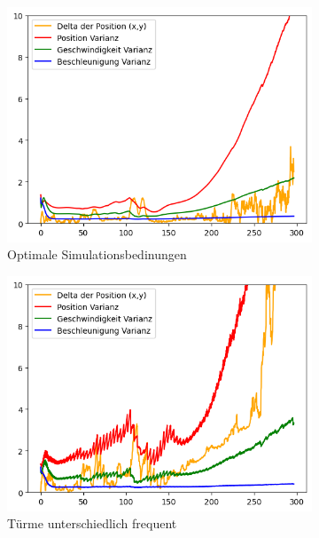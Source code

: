 \begin{figure}
    \begin{subfigure}{.333\textwidth}
        \centering
        \includegraphics[width=.9\linewidth]{Ergebnisse/plots_ungenauigkeiten/richtung/richtung_const_vel_basic.png}
        \caption{Optimale Simulationsbedinungen}
    \end{subfigure}    
    \begin{subfigure}{.333\textwidth}
        \centering
        \includegraphics[width=.9\linewidth]{Ergebnisse/plots_ungenauigkeiten/richtung/richtung_const_vel_freq.png}
        \caption{Türme unterschiedlich frequent}
    \end{subfigure}    
    \begin{subfigure}{.333\textwidth}
        \centering

\end{subfigure}
\end{figure}
